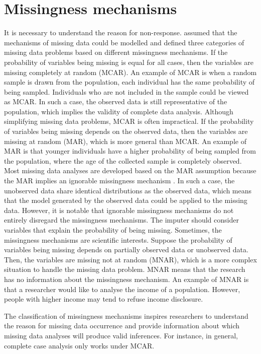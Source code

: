 \section{Missingness mechanisms}
It is necessary to understand the reason for non-response. \citet{rubin1976inference} assumed that the mechanisms of missing data could be modelled and defined three categories of missing data problems based on different missingness mechanisms. If the probability of variables being missing is equal for all cases, then the variables are missing completely at random (MCAR). An example of MCAR is when a random sample is drawn from the population, each individual has the same probability of being sampled. Individuals who are not included in the sample could be viewed as MCAR. In such a case, the observed data is still representative of the population, which implies the validity of complete data analysis. Although simplifying missing data problems, MCAR is often impractical. If the probability of variables being missing depends on the observed data, then the variables are missing at random (MAR), which is more general than MCAR. An example of MAR is that younger individuals have a higher probability of being sampled from the population, where the age of the collected sample is completely observed. Most missing data analyses are developed based on the MAR assumption because the MAR implies an ignorable missingness mechanism \citep{little2019statistical}. In such a case, the unobserved data share identical distributions as the observed data, which means that the model generated by the observed data could be applied to the missing data. However, it is notable that ignorable missingness mechanisms do not entirely disregard the missingness mechanisms. The imputer should consider variables that explain the probability of being missing. Sometimes, the missingness mechanisms are scientific interests. Suppose the probability of variables being missing depends on partially observed data or unobserved data. Then, the variables are missing not at random (MNAR), which is a more complex situation to handle the missing data problem. MNAR means that the research has no information about the missingness mechanism. An example of MNAR is that a researcher would like to analyse the income of a population. However, people with higher income may tend to refuse income disclosure.  

The classification of missingness mechanisms inspires researchers to understand the reason for missing data occurrence and provide information about which missing data analyses will produce valid inferences. For instance, in general, complete case analysis only works under MCAR.  

